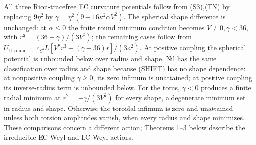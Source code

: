 All three Ricci-tracefree EC curvature potentials follow from (S3),(TN) by replacing $9\eta^2$ by
$\gamma=\eta^2(9-16\kappa^2\alpha V^2)$. The spherical shape difference is
unchanged: at $\alpha\leq0$ the finite round minimum condition becomes
$V\ne0,\gamma<36$, with $r^2=(36-\gamma)/(3V^2)$; the remaining cases follow
from $U_{\mathrm{tf},\mathrm{round}}=c_{S^3}L[V^2r^3+(\gamma-36)r]/(3\kappa^2)$.
At positive coupling the spherical potential is unbounded below over radius and shape.
Nil has the same classification over radius and shape because (SHIFT) has no shape dependence:
at nonpositive coupling $\gamma\geq0$, its zero infimum is unattained;
at positive coupling its inverse-radius term is unbounded below.
For the torus, $\gamma<0$ produces a finite radial minimum at
$r^2=-\gamma/(3V^2)$ for every shape, a degenerate minimum set in radius and shape.
Otherwise the toroidal infimum is zero and unattained unless both torsion
amplitudes vanish, when every radius and shape minimizes. These comparisons
concern a different action; Theorems 1--3 below describe the irreducible EC-Weyl and LC-Weyl actions.
